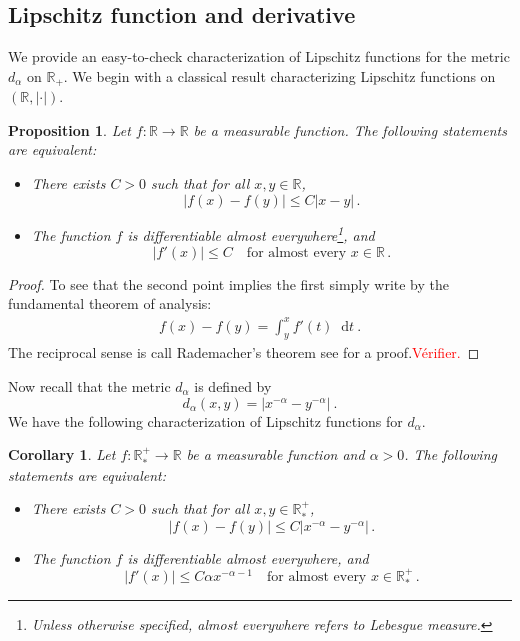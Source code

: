 \documentclass[11pt,a4paper]{article}
\newcommand{\RRP}{\mathbb{R}^+_*}
\newcommand{\red}[1]{\textcolor{red}{#1}}
\newcommand{\dd}{\mathop{}\!\mathrm{d}}
\newtheorem{proposition}[theorem]{Proposition}
\newtheorem{corollary}[theorem]{Corollary}
\begin{document}
\subsection{Lipschitz function and derivative}
We provide an easy-to-check characterization of Lipschitz functions for the metric \( d_\alpha \) on \( \mathbb{R}_+ \). We begin with a classical result characterizing Lipschitz functions on \( (\mathbb{R}, |\cdot|) \).

\begin{proposition}\label{prop:characterisation-lip-1}
Let \( f : \mathbb{R} \to \mathbb{R} \) be a measurable function. The following statements are equivalent:
\begin{itemize}
    \item There exists \( C > 0 \) such that for all \( x, y \in \mathbb{R} \),
    \[
    |f(x) - f(y)| \leq C|x - y| \,.
    \]
    \item The function \( f \) is differentiable almost everywhere\footnote{Unless otherwise specified, \emph{almost everywhere} refers to Lebesgue measure.}, and
    \[
    |f'(x)| \leq C \quad \text{for almost every } x \in \mathbb{R} \,.
    \]
\end{itemize}
\end{proposition}
\begin{proof}
    To see that the second point implies the first simply write by the fundamental theorem of analysis:
    \begin{align*}
        f(x) - f(y) = \int_y^x f'(t) \dd t \ .
    \end{align*}
    The reciprocal sense is call Rademacher’s theorem see \cite{evans2018measure} for a proof.\red{Vérifier.}
\end{proof}
Now recall that the metric $d_\alpha$ is defined by 
\[
d_\alpha(x,y) = |x^{-\alpha} - y^{-\alpha}|\ .
\]
We have the following characterization of Lipschitz functions for $d_\alpha$.
\begin{corollary}
    Let \( f : \RRP \to \mathbb{R} \) be a measurable function and $\alpha > 0$. The following statements are equivalent:
\begin{itemize}
    \item There exists \( C > 0 \) such that for all \( x, y \in \RRP \),
    \[
    |f(x) - f(y)| \leq C|x^{-\alpha} - y^{-\alpha}| \,.
    \]
    \item The function \( f \) is differentiable almost everywhere, and
    \[
    |f'(x)| \leq C\alpha x^{-\alpha-1} \quad \text{for almost every } x \in \RRP \,.
    \]
\end{itemize}
\end{corollary}
\end{document}
